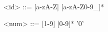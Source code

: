\begin{grammarEx}
	<id> ::= [a-zA-Z] [a-zA-Z0-9\_]*

	<num> ::= [1-9] [0-9]*
	\alt '0'
\end{grammarEx}